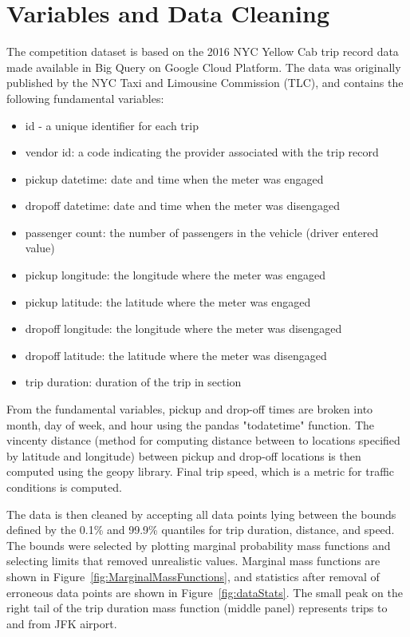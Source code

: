 \documentclass[twocolumn,10pt]{article}
\begin{document}
\section{Variables and Data Cleaning}
The competition dataset is based on the 2016 NYC Yellow Cab trip record data made available in Big Query on Google Cloud Platform. The data was originally published by the NYC Taxi and Limousine Commission (TLC), and contains the following fundamental variables:
\begin{itemize}
\item id - a unique identifier for each trip
\item vendor id: a code indicating the provider associated with the trip record
\item pickup datetime: date and time when the meter was engaged
\item dropoff datetime: date and time when the meter was disengaged
\item passenger count: the number of passengers in the vehicle (driver entered value)
\item pickup longitude: the longitude where the meter was engaged
\item pickup latitude: the latitude where the meter was engaged
\item dropoff longitude: the longitude where the meter was disengaged
\item dropoff latitude: the latitude where the meter was disengaged
\item trip duration: duration of the trip in section
\end{itemize}
From the fundamental variables, pickup and drop-off times are broken into month, day of week, and hour using the pandas "todatetime" function. The vincenty distance (method for computing distance between to locations specified by latitude and longitude) between pickup and drop-off locations is then computed using the geopy library. Final trip speed, which is a metric for traffic conditions is computed. 

The data is then cleaned by accepting all data points lying between the bounds defined by the 0.1\% and 99.9\% quantiles for trip duration, distance, and speed. The bounds were selected by plotting marginal probability mass functions and selecting limits that removed unrealistic values. Marginal mass functions are shown in Figure~\ref{fig:MarginalMassFunctions}, and statistics after removal of erroneous data points are shown in Figure~\ref{fig:dataStats}. The small peak on the right tail of the trip duration mass function (middle panel) represents trips to and from JFK airport.
\end{document}
